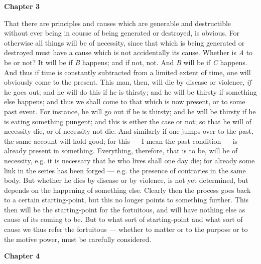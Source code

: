 \textbf{Chapter 3}

That there are principles and causes which are generable and destructible without ever being in course of being generated or destroyed, is obvious. For otherwise all things will be of necessity, since that which is being generated or destroyed must have a cause which is not accidentally its cause. Whether is \emph{A} to be or not? It will be if \emph{B} happens; and if not, not. And \emph{B} will be if \emph{C} happens. And thus if time is constantly subtracted from a limited extent of time, one will obviously come to the present. This man, then, will die by disease or violence, \emph{if} he goes out; and he will do this if he is thirsty; and he will be thirsty if something else happens; and thus we shall come to that which is now present, or to some past event. For instance, he will go out if he is thirsty; and he will be thirsty if he is eating something pungent; and this is either the case or not; so that he will of necessity die, or of necessity not die. And similarly if one jumps over to the past, the same account will hold good; for this — I mean the past condition — is already present in something. Everything, therefore, that is to be, will be of necessity, e.g. it is necessary that he who lives shall one day die; for already some link in the series has been forged — e.g. the presence of contraries in the same body. But whether he dies by disease or by violence, is not yet determined, but depends on the happening of something else. Clearly then the process goes back to a certain starting-point, but this no longer points to something further. This then will be the starting-point for the fortuitous, and will have nothing else as
cause of its coming to be. But to what sort of starting-point and what sort of cause we thus refer the fortuitous — whether to matter or to the purpose or to the motive power, must be carefully considered.

\textbf{Chapter 4}

